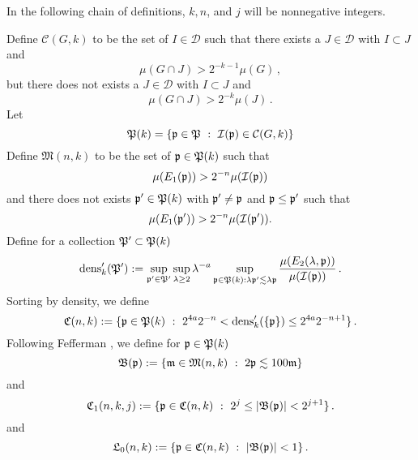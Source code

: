 In the following chain of definitions, $k, n$, and
$j$ will be nonnegative integers.

Define
$\mathcal{C}(G,k)$ to be the set of $I\in \mathcal{D}$
such that there exists a $J\in \mathcal{D}$ with $I\subset J$
and
\begin{equation}\label{muhj1}
   {\mu(G \cap J)} > 2^{-k-1}{\mu(G)}\, ,
\end{equation}
but there does not exists a $J\in \mathcal{D}$ with $I\subset J$ and
\begin{equation}\label{muhj2}
   {\mu(G \cap J)} > 2^{-k}{\mu(J)}\,.
\end{equation}
Let
\begin{equation}
    \label{eq defPk}
    \mathfrak P(k)=\{\mathfrak p\in \mathfrak P \ : \ \mathcal{I}(\mathfrak p)\in \mathcal{C}(G,k)\}
\end{equation}
Define $ {\mathfrak{M}}(n,k)$ to be the set of  $\mathfrak p \in \mathfrak P(k)$ such that
 \begin{equation}\label{ebardense}
    \mu({E_1}(\mathfrak p))  > 2^{-n}  \mu(\mathcal{I}(\mathfrak p))
 \end{equation}
and there does not exists $\mathfrak p'\in \mathfrak P(k)$ with
$\mathfrak p'\neq \mathfrak p$ and  $\mathfrak p\le \mathfrak p'$  such that
 \begin{equation}\label{mnkmax}
    \mu({E_1}(\mathfrak p'))  > 2^{-n}  \mu(\mathcal{I}(\mathfrak p')).
 \end{equation}
Define for a collection $\mathfrak P'\subset \mathfrak P(k)$
\begin{equation}
    \label{eq densdef}
   \operatorname{\operatorname{dens}}_k' (\mathfrak P'):= \sup_{\mathfrak p'\in \mathfrak P'}\sup_{\lambda \geq 2} \lambda^{-a} \sup_{\mathfrak p \in \mathfrak P(k): \lambda \mathfrak p' \lesssim \lambda \mathfrak p}
    \frac{\mu({E}_2(\lambda, \mathfrak p))}{\mu(\mathcal{I}(\mathfrak p))}\,.
\end{equation}
Sorting by density, we define
\begin{equation}
    \label{def cnk}
    \mathfrak C(n,k):=\{\mathfrak p\in \mathfrak P(k) \ : \
    2^{4a}2^{-n}< \operatorname{\operatorname{dens}}_k'(\{\mathfrak p\}) \le
    2^{4a}2^{-n+1}\}\,.
\end{equation}
Following Fefferman \cite{fefferman}, we
define for $\mathfrak p \in \mathfrak P(k)$
    \begin{equation}\label{defbfp}
         \mathfrak{B}(\mathfrak p) := \{ \mathfrak{m} \in \mathfrak{M}(n,k) \ : \ 2 \mathfrak p \lesssim 100 \mathfrak{m}\}
    \end{equation}
and
\begin{equation}\label{defcnkj}
       \mathfrak C_1(n,k,j) := \{\mathfrak p \in \mathfrak C(n,k) \ : \ 2^{j} \leq |\mathfrak{B}(\mathfrak p)| < 2^{j+1}\}\,.
\end{equation}
and
\begin{equation}\label{defl0nk}
       \mathfrak L_0(n,k) := \{\mathfrak p \in \mathfrak C(n,k) \ : \ |\mathfrak{B}(\mathfrak p)| <1\}\,.
\end{equation}
